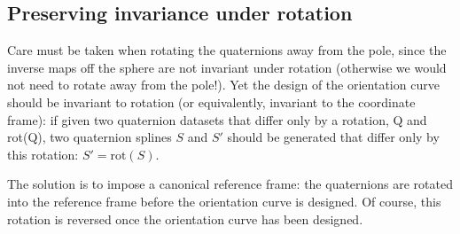\documentclass[12pt]{article}
\begin{document}

\clearpage

\subsection{Preserving invariance under rotation}
\label{sec:invariance}

Care must be taken when rotating the quaternions away from the pole,
since the inverse maps off the sphere are not invariant under rotation
(otherwise we would not need to rotate away from the pole!).
Yet the design of the orientation curve should be invariant to rotation
(or equivalently, invariant to the coordinate frame):
if given two quaternion datasets that differ only by a rotation,
Q and rot(Q), two quaternion splines $S$ and $S'$ should be generated
that differ only by this rotation: $S' = \mbox{rot}(S)$.

The solution is to impose a canonical reference frame: 
the quaternions are rotated into the reference frame before 
the orientation curve is designed.
Of course, this rotation is reversed once the orientation curve has been designed.
\end{document}

